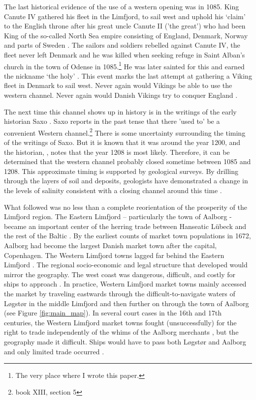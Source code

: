 \documentclass[11pt]{article}
\begin{document}
The last historical evidence of the use of a western opening was in 1085. King Canute IV gathered his fleet in the Limfjord, to sail west and uphold his ‘claim’ to the English throne after his great uncle Canute II ('the great') who had been King of the so-called North Sea empire consisting of England, Denmark, Norway and parts of Sweden \citep{Spejlborg2012}. The sailors and soldiers rebelled against Canute IV, the fleet never left Denmark and he was killed when seeking refuge in Saint Alban’s church in the town of Odense in 1085.\footnote{The very place where I wrote this paper.} He was later sainted for this and earned the nickname ‘the holy’ \citep{Pajung2012}. This event marks the last attempt at gathering a Viking fleet in Denmark to sail west. Never again would Vikings be able to use the western channel. Never again would Danish Vikings try to conquer England \citep{Roesdahl2009}.

The next time this channel shows up in history is in the writings of the early historian Saxo \cite{saxo}. Saxo reports in the past tense that there 'used to' be a convenient Western channel.\footnote{\cite{saxo} book XIII, section 5} There is some uncertainty surrounding the timing of the writings of Saxo. But it is known that it was around the year 1200, and the historian, \cite{Mortensen2018}, notes that the year 1208 is most likely. Therefore, it can be determined that the western channel probably closed sometime between 1085 and 1208. This approximate timing is supported by geological surveys. By drilling through the layers of soil and deposits, geologists have demonstrated a change in the levels of salinity consistent with a closing channel around this time \citep{Christensen2004}.

What followed was no less than a complete reorientation of the prosperity of the Limfjord region. The Eastern Limfjord – particularly the town of Aalborg - became an important center of the herring trade between Hanseatic Lübeck and the rest of the Baltic \citep{sildeboom2022}. By the earliest counts of market town populations in 1672, Aalborg had become the largest Danish market town after the capital, Copenhagen. The Western Limfjord towns lagged far behind the Eastern Limfjord \citep{Degn1989}. The regional socio-economic and legal structure that developed would mirror the geography. The west coast was dangerous, difficult, and costly for ships to approach \citep[p. 176]{Hald1833}. In practice, Western Limfjord market towns mainly accessed the market by traveling eastwards through the difficult-to-navigate waters of Løgstør in the middle Limfjord and then further on through the town of Aalborg (see Figure \ref{fig:main_map}). In several court cases in the 16th and 17th centuries, the Western Limfjord market towns fought (unsuccessfully) for the right to trade independently of the whims of the Aalborg merchants \citep[pp. 78-89]{ThistedLokalhistorie1974}, but the geography made it difficult. Ships would have to pass both Løgstør and Aalborg and only limited trade occurred \citep{Poulsen2019}.
\end{document}
